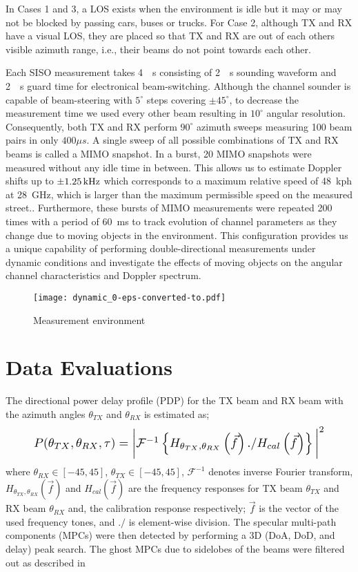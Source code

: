 \documentclass[conference]{IEEEtran}
\begin{document}
In Cases 1 and 3, a LOS exists when the environment is idle but it may or may not be blocked by passing cars, buses or trucks. For Case 2, although TX and RX have a visual LOS, they are placed so that TX and RX are out of each others visible azimuth range, i.e., their beams do not point towards each other.  

Each SISO measurement takes \SI{4}{\mu s} consisting of \SI{2}{\mu s} sounding waveform and \SI{2}{\mu s} guard time for electronical beam-switching. Although the channel sounder is capable of beam-steering with $5^\circ$ steps covering $\pm 45^\circ$, to decrease the measurement time we used every other beam resulting in $10^\circ$ angular resolution. Consequently, both TX and RX perform $90^\circ$ azimuth sweeps measuring 100 beam pairs in only $400 \mu s$. A single sweep of all possible combinations of TX and RX beams is called a MIMO snapshot. In a burst, 20 MIMO snapshots were measured without any idle time in between. This allows us to estimate Doppler shifts up to $\SI{\pm 1.25}{kHz}$ which corresponds to a maximum relative speed of \SI{48}{kph} at \SI{28}{GHz}, which is larger than the maximum permissible speed on the measured street.. Furthermore, these bursts of MIMO measurements were repeated 200 times with a period of \SI{60}{ms} to track evolution of channel parameters as they change due to moving objects in the environment. This configuration provides us a unique capability of performing double-directional measurements under dynamic conditions and investigate the effects of moving objects on the angular channel characteristics and Doppler spectrum. 


\begin{figure}[tbp]
        \centering\texttt{[image: dynamic\_0-eps-converted-to.pdf]}\caption{Measurement environment}\label{fig:loc_all}
\end{figure}

\section{Data Evaluations} \label{sec_eval}
The directional power delay profile (PDP) for the TX beam and RX beam with the azimuth angles  $\theta_{TX}$  and  $\theta_{RX}$  is estimated as;
\begin{equation}
  \resizebox{.9 \linewidth}{!} 
{
$   P(\theta_{TX},\theta_{RX},\tau) = \bigg\vert \mathcal{F}^{-1} \left\{ H_{\theta_{TX},\theta_{RX}}\left(\vec{f} \right) ./ H_{cal}\left(\vec{f} \right) \right\} \bigg\vert ^2$
}
\end{equation}
where $\theta_{RX}\in[-45,45]$,  $\theta_{TX}\in[-45,45]$, $\mathcal{F}^{-1}$ denotes inverse Fourier transform, $H_{\theta_{TX},\theta_{RX}}(\vec{f})$ and $H_{cal}(\vec{f})$ are the frequency responses for TX beam $\theta_{TX}$ and RX beam $\theta_{RX}$ and, the calibration response respectively; $\vec{f}$ is the vector of the used frequency tones, and $./$ is element-wise division. The specular multi-path components (MPCs) were then detected by performing a 3D (DoA, DoD, and delay) peak search. The ghost MPCs due to sidelobes of the beams were filtered out as described in \cite{bas_realjournal_2017}
\end{document}

